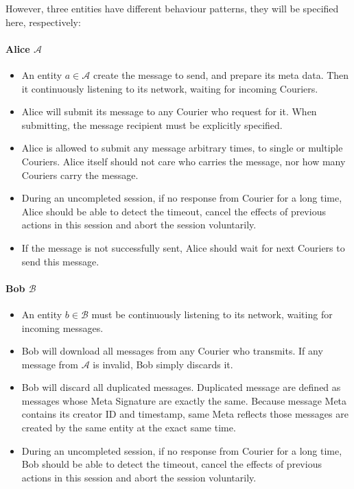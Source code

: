 However, three entities have different behaviour patterns, they will be specified here, respectively:
\paragraph{Alice $\mathcal{A}$}
\begin{itemize}
\item An entity $a \in \mathcal{A}$ create the message to send, and prepare its meta data. Then it continuously listening to its network, waiting for incoming Couriers.

\item Alice will submit its message to any Courier who request for it. When submitting, the message recipient must be explicitly specified.

\item Alice is allowed to submit any message arbitrary times, to single or multiple Couriers. Alice itself should not care who carries the message, nor how many Couriers carry the message.

\item During an uncompleted session, if no response from Courier for a long time, Alice should be able to detect the timeout, cancel the effects of previous actions in this session and abort the session voluntarily.

\item If the message is not successfully sent, Alice should wait for next Couriers to send this message.
\end{itemize}

\paragraph{Bob $\mathcal{B}$}
\begin{itemize}
\item An entity $b \in \mathcal{B}$ must be continuously listening to its network, waiting for incoming messages.

\item Bob will download all messages from any Courier who transmits. If any message from $\mathcal{A}$ is invalid, Bob simply discards it.

\item Bob will discard all duplicated messages. Duplicated message are defined as messages whose Meta Signature are exactly the same. Because message Meta contains its creator ID and timestamp, same Meta reflects those messages are created by the same entity at the exact same time.

\item During an uncompleted session, if no response from Courier for a long time, Bob should be able to detect the timeout, cancel the effects of previous actions in this session and abort the session voluntarily.
\end{itemize}

